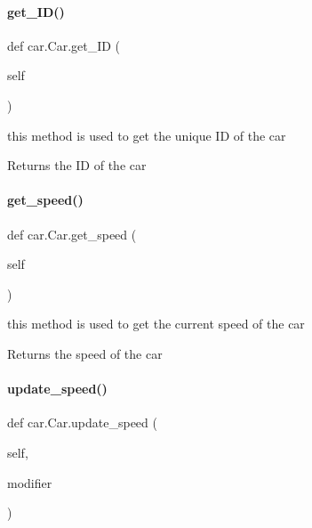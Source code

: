 \paragraph{\texorpdfstring{get\_ID()}{get\_ID()}}
{\footnotesize\ttfamily def car.\+Car.\+get\+\_\+\+ID (\begin{DoxyParamCaption}\item[{}]{self }\end{DoxyParamCaption})}



this method is used to get the unique ID of the car 

\begin{DoxyReturn}{Returns}
the ID of the car 
\end{DoxyReturn}
\mbox{\label{classcar_1_1_car_ad13e6767359488bf7df29e200d3b08c9}} 
\paragraph{\texorpdfstring{get\_speed()}{get\_speed()}}
{\footnotesize\ttfamily def car.\+Car.\+get\+\_\+speed (\begin{DoxyParamCaption}\item[{}]{self }\end{DoxyParamCaption})}



this method is used to get the current speed of the car 

\begin{DoxyReturn}{Returns}
the speed of the car 
\end{DoxyReturn}
\mbox{\label{classcar_1_1_car_a563092c468b011341076c35d3630a0ef}} 
\paragraph{\texorpdfstring{update\_speed()}{update\_speed()}}
{\footnotesize\ttfamily def car.\+Car.\+update\+\_\+speed (\begin{DoxyParamCaption}\item[{}]{self,  }\item[{}]{modifier }\end{DoxyParamCaption})}



